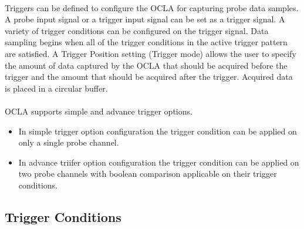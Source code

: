 \paragraph{}Triggers can be defined to configure the OCLA for capturing probe data samples. A probe input signal or a trigger input signal can be set as a trigger signal. A variety of trigger conditions can be configured on the trigger signal. Data sampling begins when all of the trigger conditions in the active trigger pattern are satisfied. A Trigger Position setting (Trigger mode) allows the user to specify the amount of data captured by the OCLA that should be acquired before the trigger and the amount that should be acquired after the trigger. Acquired data is placed in a circular buffer.
\paragraph{}OCLA supports simple and advance trigger options.
\begin{itemize}[noitemsep]
	\item In simple trigger option configuration the trigger condition can be applied on only a single probe channel.
	\item In advance triifer option configuration the trigger condition can be applied on two probe channels with boolean comparison applicable on their trigger conditions. 
\end{itemize}
\subsection*{\fontsize{14}{16}\selectfont Trigger Conditions}

